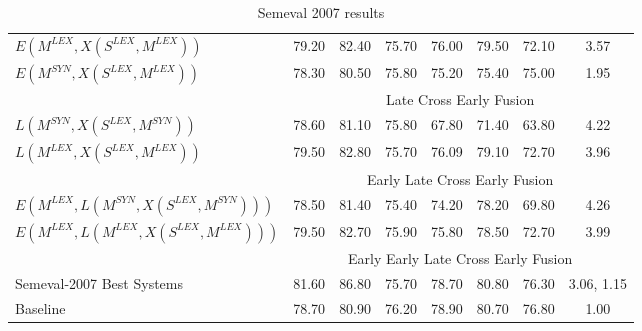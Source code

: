 \begin{table}[h!]
\begin{tabular}{@{}lccccccc@{}}
       $E(M^{LEX}, X(S^{LEX}, M^{LEX}))$		& 79.20 & 82.40 & 75.70 &	76.00	& 79.50  & 72.10 & 3.57 \\	   
	   $E(M^{SYN}, X(S^{LEX}, M^{LEX}))$		& 78.30 & 80.50 & 75.80 &	75.20	&75.40  & 75.00 & 1.95 \\	   
       \midrule
       &            \multicolumn{7}{c}{Late Cross Early Fusion}       \\ \midrule	  
	   $L(M^{SYN}, X(S^{LEX}, M^{SYN}))$		& 78.60 & 81.10 & 75.80 &	67.80	& 71.40&63.80 & 4.22 \\	   
	   $L(M^{LEX}, X(S^{LEX}, M^{LEX}))$		& 79.50 & 82.80 & 75.70 &	76.09	&79.10 &72.70 & 3.96 \\	   
       \midrule
       &            \multicolumn{7}{c}{Early Late Cross Early Fusion}       \\ \midrule	  
	   $E(M^{LEX}, L(M^{SYN}, X(S^{LEX}, M^{SYN})))$		& 78.50 & 81.40 & 75.40 &	74.20	& 78.20 & 69.80& 4.26 \\	   
	   $E(M^{LEX}, L(M^{LEX}, X(S^{LEX}, M^{LEX})))$		& 79.50 & 82.70 & 75.90 &	75.80	& 78.50&72.70 & 3.99 \\
	   \midrule
	   &            \multicolumn{7}{c}{Early Early Late Cross Early Fusion}       \\ \midrule	  
	   
	   \midrule \midrule
	   
	   Semeval-2007 Best Systems& 81.60 & 86.80 & 75.70 &	78.70	& 80.80&76.30 & 3.06, 1.15 \\ 	 
	   Baseline 		& 78.70 & 80.90 & 76.20 &	78.90	& 80.70&76.80 & 1.00 \\ 	   	 	    
		   
       \bottomrule
       
       
\end{tabular}
\caption{Semeval 2007 results}
\label{my-label}
\end{table}